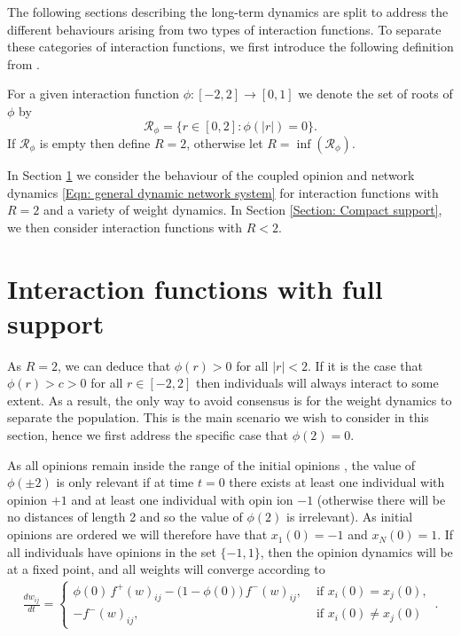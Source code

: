 \documentclass{article}
\begin{document}
The following sections describing the long-term dynamics are split to address the different behaviours arising from two types of interaction functions. To separate these categories of interaction functions, we first introduce the following definition from \cite{NugentGomesWolfram2024}.
\begin{definition}
     For a given interaction function $\phi:[-2,2]\rightarrow[0,1]$ we denote the set of roots of $\phi$ by 
    \begin{equation}
        \mathcal{R}_\phi = \{ r \in [0,2] : \phi(|r|) = 0 \}.
    \end{equation}
    If $\mathcal{R}_\phi$ is empty then define $R = 2$, otherwise let $R = \inf (\mathcal{R}_\phi)$. 
\end{definition}
In Section \ref{Section: Full support} we consider the behaviour of the coupled opinion and network dynamics \eqref{Eqn: general dynamic network system} for interaction functions with $R=2$ and a variety of weight dynamics. In Section \ref{Section: Compact support}, we then consider interaction functions with $R<2$. 

\section{Interaction functions with full support} \label{Section: Full support}

As $R=2$, we can deduce that $\phi(r)>0$ for all $|r|<2$. If it is the case that $\phi(r)>c>0$ for all $r \in [-2,2]$ then individuals will always interact to some extent. As a result, the only way to avoid consensus is for the weight dynamics to separate the population. This is the main scenario we wish to consider in this section, hence we first address the specific case that $\phi(2)=0$. 

As all opinions remain inside the range of the initial opinions \cite{nugent2023evolving}, the value of $\phi(\pm2)$ is only relevant if at time $t=0$ there exists at least one individual with opinion $+1$ and at least one individual with opin ion $-1$ (otherwise there will be no distances of length 2 and so the value of $\phi(2)$ is irrelevant). As initial opinions are ordered we will therefore have that $x_1(0)=-1$ and $x_N(0)=1$. If all individuals have opinions in the set $\{-1,1\}$, then the opinion dynamics will be at a fixed point, and all weights will converge according to 
\begin{align*}
    \frac{dw_{ij}}{dt} =
    \begin{cases}
        \phi(0)\, f^+(w)_{ij} - \big(1 - \phi(0)\big)\, f^-(w)_{ij}, & \text{ if } x_i(0)=x_j(0), \\[0.4em]
        - f^-(w)_{ij}, & \text{ if } x_i(0) \neq x_j(0)
    \end{cases}\,.
\end{align*}
\end{document}
